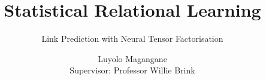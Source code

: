 \graphicspath{{Figs/}} %
\title{Statistical Relational Learning}

\subtitle{ Link Prediction with Neural Tensor Factorisation}

\author{Luyolo Magangane \\ {\small Supervisor: Professor Willie Brink}}









